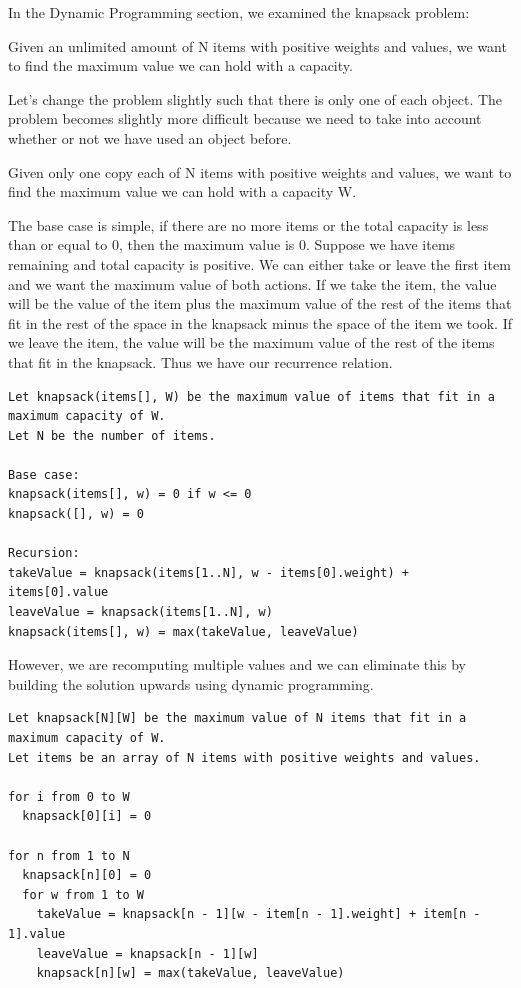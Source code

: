 \documentclass[11pt,oneside]{book}
\begin{document}
In the Dynamic Programming section, we examined the knapsack problem:

Given an unlimited amount of N items with positive weights and values, we want to find the maximum value we can hold with a capacity.

Let's change the problem slightly such that there is only one of each object. The problem becomes slightly more difficult because we need to take into account whether or not we have used an object before.

Given only one copy each of N items with positive weights and values, we want to find the maximum value we can hold with a capacity W.

The base case is simple, if there are no more items or the total capacity is less than or equal to 0, then the maximum value is 0. Suppose we have items remaining and total capacity is positive. We can either take or leave the first item and we want the maximum value of both actions. If we take the item, the value will be the value of the item plus the maximum value of the rest of the items that fit in the rest of the space in the knapsack minus the space of the item we took. If we leave the item, the value will be the maximum value of the rest of the items that fit in the knapsack. Thus we have our recurrence relation.

\begin{lstlisting}
Let knapsack(items[], W) be the maximum value of items that fit in a maximum capacity of W.
Let N be the number of items.

Base case:
knapsack(items[], w) = 0 if w <= 0
knapsack([], w) = 0

Recursion:
takeValue = knapsack(items[1..N], w - items[0].weight) + items[0].value
leaveValue = knapsack(items[1..N], w)
knapsack(items[], w) = max(takeValue, leaveValue)
\end{lstlisting}

However, we are recomputing multiple values and we can eliminate this by building the solution upwards using dynamic programming.

\begin{lstlisting}
Let knapsack[N][W] be the maximum value of N items that fit in a maximum capacity of W.
Let items be an array of N items with positive weights and values.

for i from 0 to W
  knapsack[0][i] = 0

for n from 1 to N
  knapsack[n][0] = 0
  for w from 1 to W
    takeValue = knapsack[n - 1][w - item[n - 1].weight] + item[n - 1].value
    leaveValue = knapsack[n - 1][w]
    knapsack[n][w] = max(takeValue, leaveValue)
\end{lstlisting}
\end{document}

